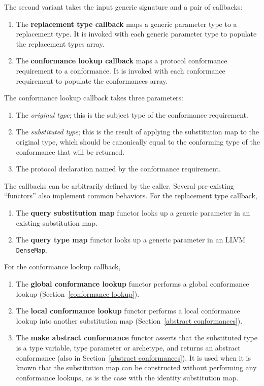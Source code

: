 \documentclass[a4paper,headsepline,bibliography=totoc,toc=flat,fleqn,twoside=semi]{scrbook}
\theoremstyle{definition}
\theoremstyle{definition}
\theoremstyle{definition}
\begin{document}
The second variant takes the input generic signature and a pair of callbacks:
\begin{enumerate}
\item The \textbf{replacement type callback} maps a generic parameter type to a replacement type. It is invoked with each generic parameter type to populate the replacement types array.
\item The \textbf{conformance lookup callback} maps a protocol conformance requirement to a conformance. It is invoked with each conformance requirement to populate the conformances array.
\end{enumerate}
The conformance lookup callback takes three parameters:
\begin{enumerate}
\item The \emph{original type}; this is the subject type of the conformance requirement.
\item The \emph{substituted type}; this is the result of applying the substitution map to the original type, which should be canonically equal to the conforming type of the conformance that will be returned.
\item The protocol declaration named by the conformance requirement.
\end{enumerate}
The callbacks can be arbitrarily defined by the caller. Several pre-existing ``functors'' also implement common behaviors. For the replacement type callback,
\begin{enumerate}
\item The \textbf{query substitution map} functor looks up a generic parameter in an existing substitution map.
\item The \textbf{query type map} functor looks up a generic parameter in an LLVM \texttt{DenseMap}.
\end{enumerate}
For the conformance lookup callback,
\begin{enumerate}
\item The \textbf{global conformance lookup} functor performs a global conformance lookup (Section~\ref{conformance lookup}).
\item The \textbf{local conformance lookup} functor performs a local conformance lookup into another substitution map (Section~\ref{abstract conformances}).
\item The \textbf{make abstract conformance} functor asserts that the substituted type is a type variable, type parameter or archetype, and returns an abstract conformance (also in Section~\ref{abstract conformances}). It is used when it is known that the substitution map can be constructed without performing any conformance lookups, as is the case with the identity substitution map.
\end{enumerate}
\end{document}
